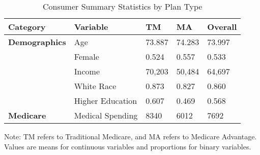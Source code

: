 \begin{table}[ht]
  \scriptsize
  \renewcommand{\arraystretch}{1.2}
  \centering
  \begin{threeparttable}
    \caption{Consumer Summary Statistics by Plan Type}
    \begin{tabular}{ll|lll}
      \toprule
      \textbf{Category} & \textbf{Variable} & \textbf{TM} & \textbf{MA} & \textbf{Overall} \\
      \midrule
      \textbf{Demographics} & Age & 73.887 & 74.283 & 73.997 \\
      & Female & 0.524 & 0.557 & 0.533 \\
      & Income & 70,203 & 50,484 & 64,697 \\
      & White Race & 0.873 & 0.827 & 0.860 \\
      & Higher Education & 0.607 & 0.469 & 0.568 \\
      \textbf{Medicare} & Medical Spending & 8340 & 6012 & 7692 \\
      \bottomrule
    \end{tabular}
    \begin{tablenotes}
      \footnotesize
      \item Note: TM refers to Traditional Medicare, and MA refers to Medicare Advantage. Values are means for continuous variables and proportions for binary variables.
    \end{tablenotes}
  \end{threeparttable}
  \label{tab:consumer_summary}
\end{table}
